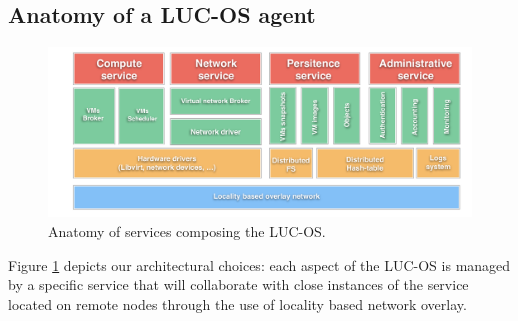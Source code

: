 \subsection{Anatomy of a LUC-OS agent}


\begin{figure}
	\centerline{
	 \includegraphics[width=1.25\linewidth]{Figures/luc_os_anatomy.pdf}
  }
	\caption{Anatomy of services composing the LUC-OS.}%
	\label{fig:anatomy}%
\end{figure}


\label{sec:anatomy_lucos}
Figure \ref{fig:anatomy} depicts our architectural choices: each aspect of the 
LUC-OS is managed by a specific service that will collaborate with close 
instances of the service located on remote nodes through the use of locality
based network overlay. 

